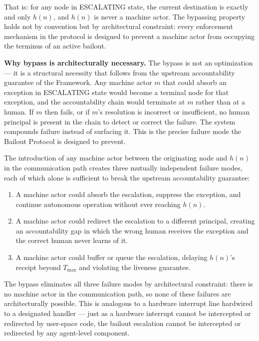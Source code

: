 That is: for any node in ESCALATING state, the current destination is exactly and only $h(n)$, and $h(n)$ is never a machine actor. The bypassing property holds not by convention but by architectural constraint: every enforcement mechanism in the protocol is designed to prevent a machine actor from occupying the terminus of an active bailout.

\bigskip
\noindent\textbf{Why bypass is architecturally necessary.} The bypass is not an optimization --- it is a structural necessity that follows from the upstream accountability guarantee of the \bxthree{} Framework. Any machine actor $m$ that could absorb an exception in ESCALATING state would become a terminal node for that exception, and the accountability chain would terminate at $m$ rather than at a human. If $m$ then fails, or if $m$'s resolution is incorrect or insufficient, no human principal is present in the chain to detect or correct the failure. The system compounds failure instead of surfacing it. This is the precise failure mode the Bailout Protocol is designed to prevent.

The introduction of any machine actor between the originating node and $h(n)$ in the communication path creates three mutually independent failure modes, each of which alone is sufficient to break the upstream accountability guarantee:

\begin{enumerate}
\item[\textbf{Intercept.}] A machine actor could absorb the escalation, suppress the exception, and continue autonomous operation without ever reaching $h(n)$.

\item[\textbf{Redirect.}] A machine actor could redirect the escalation to a different principal, creating an accountability gap in which the wrong human receives the exception and the correct human never learns of it.

\item[\textbf{Delay.}] A machine actor could buffer or queue the escalation, delaying $h(n)$'s receipt beyond $T_{\max}$ and violating the liveness guarantee.
\end{enumerate}

The bypass eliminates all three failure modes by architectural constraint: there is no machine actor in the communication path, so none of these failures are architecturally possible. This is analogous to a hardware interrupt line hardwired to a designated handler --- just as a hardware interrupt cannot be intercepted or redirected by user-space code, the bailout escalation cannot be intercepted or redirected by any agent-level component.

